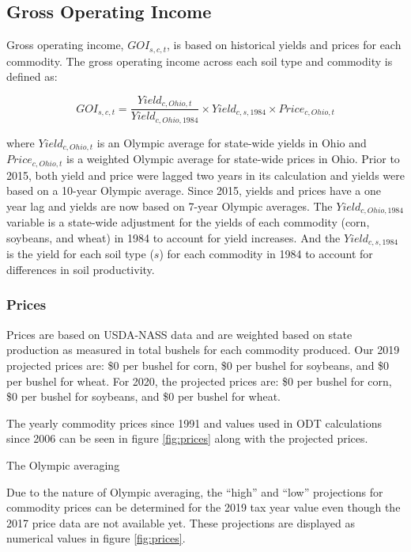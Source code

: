 \documentclass[]{article}
\begin{document}
\newpage

\hypertarget{gross-operating-income}{%
\subsection{Gross Operating Income}\label{gross-operating-income}}

Gross operating income, \(GOI_{s,c,t}\), is based on historical yields
and prices for each commodity. The gross operating income across each
soil type and commodity is defined as:

\[
GOI_{s,c,t} = \frac{Yield_{c,Ohio,t}}{Yield_{c,Ohio,1984}} \times Yield_{c,s,1984} \times Price_{c,Ohio,t}
\]

where \(Yield_{c,Ohio,t}\) is an Olympic average for state-wide yields
in Ohio and \(Price_{c,Ohio,t}\) is a weighted Olympic average for
state-wide prices in Ohio. Prior to 2015, both yield and price were
lagged two years in its calculation and yields were based on a 10-year
Olympic average. Since 2015, yields and prices have a one year lag and
yields are now based on 7-year Olympic averages. The
\(Yield_{c,Ohio,1984}\) variable is a state-wide adjustment for the
yields of each commodity (corn, soybeans, and wheat) in 1984 to account
for yield increases. And the \(Yield_{c,s,1984}\) is the yield for each
soil type (\(s\)) for each commodity in 1984 to account for differences
in soil productivity.

\hypertarget{prices}{%
\subsubsection{Prices}\label{prices}}

Prices are based on USDA-NASS data and are weighted based on state
production as measured in total bushels for each commodity produced. Our
2019 projected prices are: \$0 per bushel for corn, \$0 per bushel for
soybeans, and \$0 per bushel for wheat. For 2020, the projected prices
are: \$0 per bushel for corn, \$0 per bushel for soybeans, and \$0 per
bushel for wheat.

The yearly commodity prices since 1991 and values used in ODT
calculations since 2006 can be seen in figure \ref{fig:prices} along
with the projected prices.

The Olympic averaging

Due to the nature of Olympic averaging, the ``high'' and ``low''
projections for commodity prices can be determined for the 2019 tax year
value even though the 2017 price data are not available yet. These
projections are displayed as numerical values in figure
\ref{fig:prices}.
\end{document}
